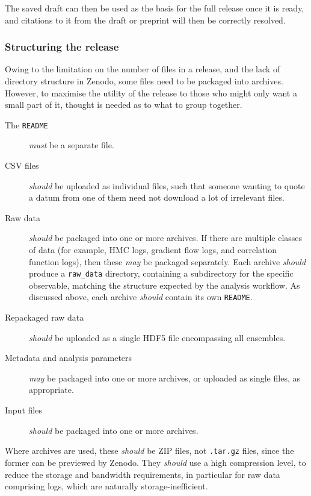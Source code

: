 \documentclass{article}
\newcommand\rfcword[1]{\emph{#1}\xspace}
\newcommand\must{\rfcword{must}}
\newcommand\should{\rfcword{should}}
\newcommand\may{\rfcword{may}}
\newcommand\filename[1]{\texttt{#1}\xspace}
\newcommand\readme{\filename{README}}
\begin{document}
The saved draft can then be used as the basis for the full release once it is ready,
and citations to it from the draft or preprint will then be correctly resolved.

\subsubsection{Structuring the release}

Owing to the limitation on the number of files in a release,
and the lack of directory structure in Zenodo,
some files need to be packaged into archives.
However,
to maximise the utility of the release to
those who might only want a small part of it,
thought is needed as to what to group together.

\begin{description}
  \item[The \readme]
        \must be a separate file.
  \item[CSV files]
        \should be uploaded as individual files,
        such that someone wanting to quote a datum from one of them
        need not download a lot of irrelevant files.
  \item[Raw data]
        \should be packaged into one or more archives.
        If there are multiple classes of data
        (for example,
        HMC logs, gradient flow logs, and correlation function logs),
        then these \may be packaged separately.
        Each archive \should produce a \filename{raw\_data} directory,
        containing a subdirectory for the specific observable,
        matching the structure expected by the analysis workflow.
        As discussed above,
        each archive \should contain its own \readme.
  \item[Repackaged raw data]
        \should be uploaded as a single HDF5 file encompassing all ensembles.
  \item[Metadata and analysis parameters]
        \may be packaged into one or more archives,
        or uploaded as single files,
        as appropriate.
  \item[Input files]
        \should be packaged into one or more archives.
\end{description}

Where archives are used,
these \should be ZIP files,
not \filename{.tar.gz} files,
since the former can be previewed by Zenodo.
They \should use a high compression level,
to reduce the storage and bandwidth requirements,
in particular for raw data comprising logs,
which are naturally storage-inefficient.
\end{document}
